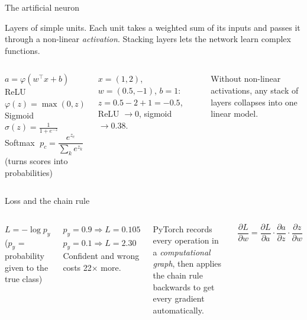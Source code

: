 \documentclass[aspectratio=169,11pt]{beamer}
\begin{document}

\begin{frame}{The artificial neuron}
\begin{bdef}
Layers of simple units. Each unit takes a weighted sum of its inputs and passes it through a non-linear \emph{activation}. Stacking layers lets the network learn complex functions.
\end{bdef}
\begin{columns}[T]
\begin{bmath}
$a=\varphi(w^\top x+b)$\\[3pt]
ReLU $\varphi(z)=\max(0,z)$ \quad Sigmoid $\sigma(z)=\frac{1}{1+e^{-z}}$\\[3pt]
Softmax $\;p_c=\dfrac{e^{z_c}}{\sum_{k}e^{z_k}}$ (turns scores into probabilities)
\end{bmath}
\begin{bex}
$x=(1,2)$, $w=(0.5,-1)$, $b=1$: $z=0.5-2+1=-0.5$, ReLU $\rightarrow 0$, sigmoid $\rightarrow 0.38$.
\end{bex}
\begin{bwarn}
Without non-linear activations, any stack of layers collapses into one linear model.
\end{bwarn}
\end{columns}
\end{frame}

\begin{frame}{Loss and the chain rule}
\begin{columns}[T]
\begin{bmath}
$L=-\log p_y$ \quad ($p_y$ = probability given to the true class)
\end{bmath}
\begin{bex}
$p_y=0.9\Rightarrow L=0.105$ \qquad $p_y=0.1\Rightarrow L=2.30$\\ Confident and wrong costs 22$\times$ more.
\end{bex}
\begin{bdef}[Autograd]
PyTorch records every operation in a \emph{computational graph}, then applies the chain rule backwards to get every gradient automatically.
\end{bdef}
\begin{bmath}
$\dfrac{\partial L}{\partial w}=\dfrac{\partial L}{\partial a}\cdot\dfrac{\partial a}{\partial z}\cdot\dfrac{\partial z}{\partial w}$
\end{bmath}
\end{columns}
\end{frame}
\end{document}
